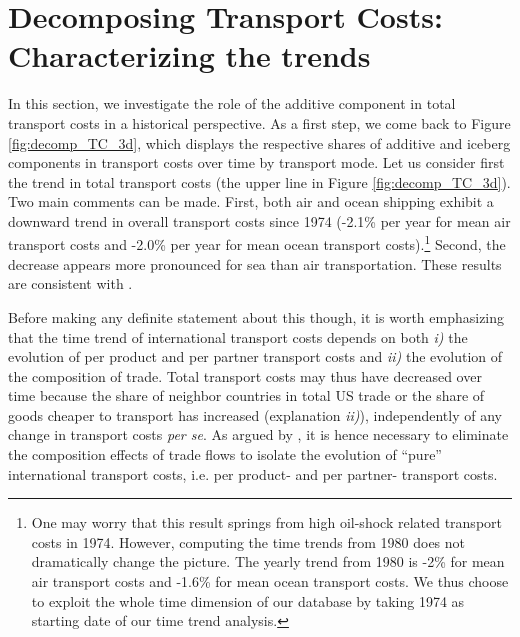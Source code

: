 \documentclass[a4paper,11pt]{article}
\begin{document}
\section{Decomposing Transport Costs: Characterizing the trends \label{sec:results_trends}}

In this section, we investigate the role of the additive component in total transport costs in a historical perspective.
As a first step, we come back to Figure \ref{fig:decomp_TC_3d}, which displays the respective shares of additive and iceberg components in transport costs over time by transport mode.
Let us consider first the trend in total transport costs (the upper line in Figure \ref{fig:decomp_TC_3d}). Two main comments can be made. First, both air and ocean shipping exhibit a downward trend in overall transport costs since 1974 (-2.1\% per year for mean air transport costs and -2.0\% per year for mean ocean transport costs).\footnote{One may worry that this result springs from high oil-shock related transport costs in 1974. However, computing the time trends from 1980 does not dramatically change the picture. The yearly trend from 1980 is -2\% for mean air transport costs and -1.6\% for mean ocean transport costs. We thus choose to exploit the whole time dimension of our database by taking 1974 as starting date of our time trend analysis.} Second, the decrease appears more pronounced for sea than air transportation. These results are consistent with \citet{hummels2007}.

Before making any definite statement about this though, it is worth emphasizing that the time trend of international transport costs depends on both \textit{i)} the evolution of per product and per partner transport costs and \textit{ii)} the evolution of the composition of trade. Total transport costs may thus have decreased over time because the share of neighbor countries in total US trade or the share of goods cheaper to transport has increased (explanation \textit{ii)}), independently of any change in transport costs \textit{per se}. As argued by \citet{hummels2007}, it is hence necessary to eliminate the composition effects of trade flows to isolate the evolution of ``pure'' international transport costs, i.e. per product- and per partner- transport costs.
\end{document}
